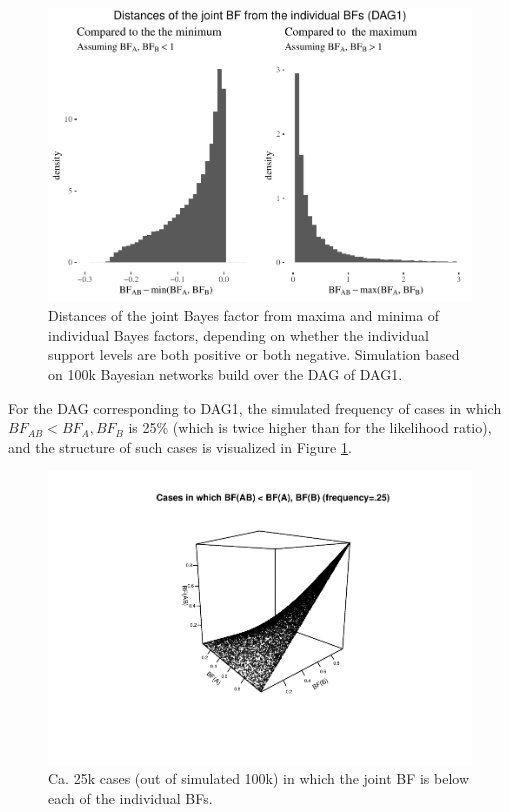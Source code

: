 \documentclass[
  10pt,
  dvipsnames,enabledeprecatedfontcommands]{scrartcl}
\begin{document}
\normalsize

\begin{figure}[ht]

\begin{center}\includegraphics[width=1\linewidth]{conjunction-appendix9_files/figure-latex/BFind-1} \end{center}
\caption{Distances of the joint Bayes factor from maxima and minima of individual Bayes factors, depending on whether the individual support levels are both positive or both negative. Simulation based on 100k Bayesian networks build over the DAG of \textsf{DAG1}.}
\end{figure}

For the DAG corresponding to \textsf{DAG1}, the simulated frequency of
cases in which \(BF_{AB} < BF_{A}, BF_{B}\) is 25\% (which is twice
higher than for the likelihood ratio), and the structure of such cases
is visualized in Figure \ref{fig:BFfails}.

\begin{figure}

\begin{center}\includegraphics[width=1\linewidth]{conjunction-appendix9_files/figure-latex/unnamed-chunk-7-1} \end{center}
\caption{Ca. 25k cases (out of simulated 100k) in which the joint BF is below each of the individual BFs.}
\label{fig:BFfails}
\end{figure}
\end{document}
